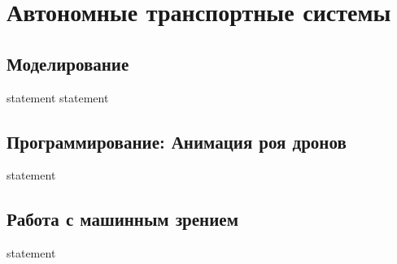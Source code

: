 \chapter{Автономные транспортные системы}

\section{Моделирование}

{statement}
{statement}

\section{Программирование: Анимация роя дронов}

{statement}

\section{Работа с машинным зрением}

{statement}